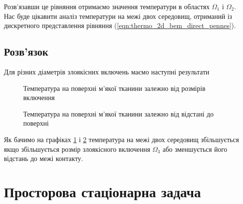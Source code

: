 Розв'язавши це рівняння отримаємо значення температури в областях $\Omega_1$ і $\Omega_2$. Нас буде цікавити аналіз 
температури на межі двох середовищ, отриманий із дискретного представлення рівняння 
(\ref{eqn:thermo_2d_bem_direct_pennes}). 

\subsection{Розв'язок}

Для різних діаметрів злоякісних включень маємо наступні результати

\begin{figure}[ht!]
    \centering
    \caption{Температура на поверхні м'якої тканини залежно від розмірів включення}
    \label{fig:thermo_2d_solution_border_temp_size}
\end{figure}

\begin{figure}[ht!]
    \centering
    \caption{Температура на поверхні м'якої тканини залежно від відстані до поверхні}
    \label{fig:thermo_2d_solution_border_temp_depth}
\end{figure}

Як бачимо на графіках \ref{fig:thermo_2d_solution_border_temp_size} і \ref{fig:thermo_2d_solution_border_temp_depth}
температура на межі двох середовищ збільшується якщо збільшується розмір злоякісного включення $\Omega_3$ або 
зменшується його відстань до межі контакту.

\section{Просторова стаціонарна задача}

